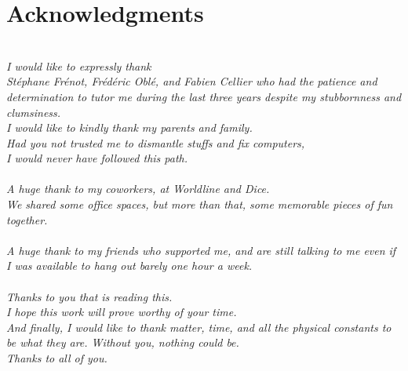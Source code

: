 
\vspace*{\fill}
\section*{Acknowledgments}
\begin{flushleft}
\noindent%
\textit{
~\\
I would like to expressly thank\\
Stéphane Frénot, Frédéric Oblé, and Fabien Cellier who had the patience and determination to tutor me during the last three years despite my stubbornness and clumsiness.
\\[30pt]
%
I would like to kindly thank my parents and family.\\
Had you not trusted me to dismantle stuffs and fix computers,\\
I would never have followed this path.\\
{}\\[30pt]
%
A huge thank to my coworkers, at Worldline and Dice.\\
We shared some office spaces, but more than that, some memorable pieces of fun together.\\
{}\\[30pt]
%
A huge thank to my friends who supported me, and are still talking to me even if I was available to hang out barely one hour a week.\\
{}\\[30pt]
%
%
Thanks to you that is reading this.\\
I hope this work will prove worthy of your time.
\\[30pt]
%
And finally, I would like to thank matter, time, and all the physical constants to be what they are.
Without you, nothing could be.\\[30pt]
%
\huge Thanks to all of you.
}
\end{flushleft}
\vspace*{\fill}
\eject